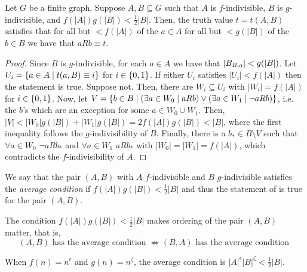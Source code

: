 \begin{lemma}[Claim 4.6)] \label{lem:average_condition_statement}
        Let $G$ be a finite graph.
        Suppose $A, B \subseteq G$ such that $A$ is $f$-indivisible, $B$ is $g$-indivisible, and $f(|A|) g(|B|) < \frac{1}{2} |B|$.
        Then, the truth value $t = t(A,B)$ satisfies that for all but $< f(|A|)$ of the $a \in A$ for all but $< g(|B|)$ of
        the $b \in B$ we have that $a R b \equiv t$.
        \begin{proof}
            Since $B$ is $g$-indivisible, for each $a \in A$ we have that $| B_{B,a} | < g(|B|)$.
            Let $U_i = \{ a \in A \mid t(a,B) \equiv i \}$ for $i \in \{ 0,1 \}$.
            If either $U_i$ satisfies $|U_i| < f(|A|)$ then the statement is true.
            Suppose not.
            Then, there are $W_i \subseteq U_i$ with $|W_i| = f(|A|)$ for $i \in \{ 0,1 \}$.
            Now, let $V = \{ b \in B \mid (\exists a \in W_0 \mid a R b) \vee (\exists a \in W_1 \mid \lnot a R b) \}$,
            i.e. the $b$'s which are an exception for some $a \in W_0 \cup W_1$.
            Then, $|V| < |W_0| g(|B|) + |W_1| g(|B|) = 2 f(|A|) g(|B|) < |B|$, where the first inequality follows the
            $g$-indivisibility of $B$.
            Finally, there is a $b_* \in B \setminus V$ such that $\forall a \in W_0$ $\lnot a R b_*$ and
            $\forall a \in W_1$ $a R b_*$ with $|W_0| = |W_1| = f(|A|)$, which contradicts the $f$-indivisibility of $A$.
        \end{proof}
    \end{lemma}

    \begin{definition}
        We say that the pair $(A,B)$ with $A$ $f$-indivisible and $B$ $g$-indivisible satisfies the \emph{average condition} if
        $f(|A|) g(|B|) < \frac{1}{2} |B|$ and thus the statement of  is true for
        the pair $(A,B)$.
    \end{definition}

    \begin{remark}
        The condition $f(|A|) g(|B|) < \frac{1}{2} |B|$ makes ordering of the pair $(A,B)$ matter, that is,
        \[
            (A,B) \text{ has the average condition } \not\Rightarrow (B,A) \text{ has the average condition }
        \]
    \end{remark}

    \begin{remark}[Remark 4.7]
        When $f(n) = n^\epsilon$ and $g(n) = n^\zeta$, the average condition is $|A|^\epsilon |B|^\zeta < \frac{1}{2} |B|$.
    \end{remark}


